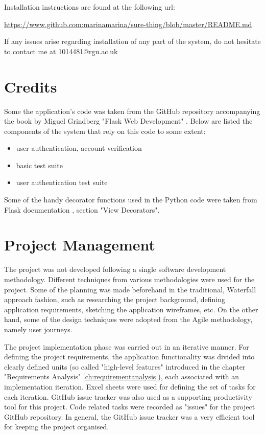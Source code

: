 Installation instructions are found at the following url:

\url{https://www.github.com:marinamarina/sure-thing/blob/master/README.md}.


If any issues arise regarding installation of any part of the system, do not hesitate to contact me at 1014481@rgu.ac.uk

\chapter{Credits}
\label{ch:credits_appendix}
Some the application's code was taken from the GitHub repository accompanying the book by Miguel Grindberg "Flask Web Development" \citep{book:Grindberg2014FlaskWebDevelopment}. Below are listed the components of the system that rely on this code to some extent:

\begin{itemize}
	\item user authentication, account verification
	\item basic test suite
	\item user authentication test suite
\end{itemize}

Some of the handy decorator functions used in the Python code were taken from Flask documentation \citep{documentation:Flask}, section "View Decorators".

\chapter{Project Management}
\label{ch:pm_appendix}
The project was not developed following a single software development methodology. Different techniques from various methodologies were used for the project. Some of the planning was made beforehand in the traditional, Waterfall approach fashion, such as researching the project background, defining application requirements, sketching the application wireframes, etc. On the other hand, some of the design techniques were adopted from the Agile methodology, namely user journeys. 

The project implementation phase was carried out in an iterative manner. For defining the project requirements, the application functionality was divided into clearly defined units (so called "high-level features" introduced in the chapter "Requirements Analysis" \ref{ch:requirementanalysis}), each associated with an implementation iteration. Excel sheets were used for defining the set of tasks for each iteration. GitHub issue tracker was also used as a supporting productivity tool for this project. Code related tasks were recorded as "issues" for the project GitHub repository. In general, the GitHub issue tracker was a very efficient tool for keeping the project organised. 

